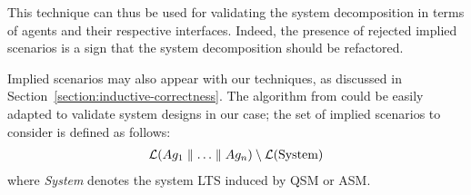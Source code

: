 This technique can thus be used for validating the system decomposition in terms of agents and their respective interfaces. Indeed, the presence of rejected implied scenarios is a sign that the system decomposition should be refactored.

Implied scenarios may also appear with our techniques, as discussed in Section~\ref{section:inductive-correctness}. The algorithm from \cite{Uchitel:2004} could be easily adapted to validate system designs in our case; the set of implied scenarios to consider is defined as follows:
\begin{align*}
\mathcal{L}(Ag_1 \parallel \ldots \parallel Ag_n) \setminus \mathcal{L}(\mbox{System})
\end{align*}
where \emph{System} denotes the system LTS induced by QSM or ASM.





